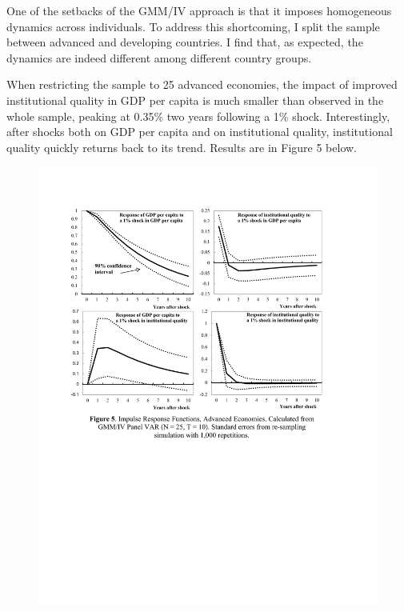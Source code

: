 \documentclass{article}
\begin{document}
One of the setbacks of the GMM/IV approach is that it imposes homogeneous dynamics across individuals. To address this shortcoming, I split the sample between advanced and developing countries. I find that, as expected, the dynamics are indeed different among different country groups.

When restricting the sample to 25 advanced economies, the impact of improved institutional quality in GDP per capita is much smaller than observed in the whole sample, peaking at 0.35\% two years following a 1\% shock. Interestingly, after shocks both on GDP per capita and on institutional quality, institutional quality quickly returns back to its trend. Results are in Figure 5 below.

\newpage

\begin{figure}[ht!]
\begin{center}
    \includegraphics[scale=0.675]{advanced.pdf}
\end{center}
\end{figure}
\end{document}
